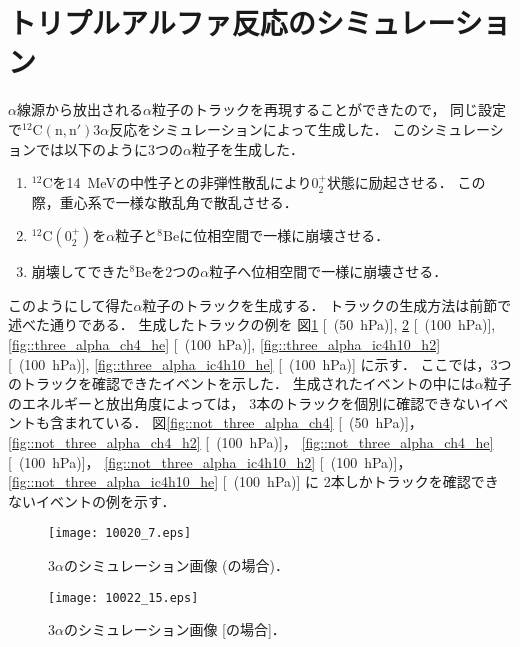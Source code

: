 \documentclass[../master]{subfiles}
\begin{document}
\section{トリプルアルファ反応のシミュレーション}
\label{sec::triple_alpha_simulation}
$\alpha$線源から放出される$\alpha$粒子のトラックを再現することができたので，
同じ設定で${}^{12}{\mathrm{C}}({\mathrm{n}},{\mathrm{n}}')3\alpha$反応をシミュレーションによって生成した．
このシミュレーションでは以下のように3つの$\alpha$粒子を生成した．
\begin{enumerate}
\item
  ${}^{12}\mathrm{C}$を\SI{14}{\mega\electronvolt}の中性子との非弾性散乱により$0_2^+$状態に励起させる．
  この際，重心系で一様な散乱角で散乱させる．
\item
  ${}^{12}\mathrm{C} (0_2^+)$を$\alpha$粒子と${}^{8}\mathrm{Be}$に位相空間で一様に崩壊させる．
\item
  崩壊してできた${}^{8}\mathrm{Be}$を2つの$\alpha$粒子へ位相空間で一様に崩壊させる．
\end{enumerate}
このようにして得た$\alpha$粒子のトラックを生成する．
トラックの生成方法は前節で述べた通りである．
生成したトラックの例を
図\ref{fig::three_alpha_ch4} [\Methane~(\SI{50}{\hecto\pascal})],
\ref{fig::three_alpha_ch4_h2} [\Methane~(\SI{100}{\hecto\pascal})],
\ref{fig::three_alpha_ch4_he} [\Methane~(\SI{100}{\hecto\pascal})],
\ref{fig::three_alpha_ic4h10_h2} [\isoButaneHydro~(\SI{100}{\hecto\pascal})],
\ref{fig::three_alpha_ic4h10_he} [\isoButaneHerium~(\SI{100}{\hecto\pascal})] に示す．
ここでは，3つのトラックを確認できたイベントを示した．
生成されたイベントの中には$\alpha$粒子のエネルギーと放出角度によっては，
3本のトラックを個別に確認できないイベントも含まれている．
図\ref{fig::not_three_alpha_ch4} [\Methane~(\SI{50}{\hecto\pascal})]，
\ref{fig::not_three_alpha_ch4_h2} [\MethaneHydro~(\SI{100}{\hecto\pascal})]，
\ref{fig::not_three_alpha_ch4_he} [\MethaneHerium~(\SI{100}{\hecto\pascal})]，
\ref{fig::not_three_alpha_ic4h10_h2} [\isoButaneHydro~(\SI{100}{\hecto\pascal})]，
\ref{fig::not_three_alpha_ic4h10_he} [\isoButaneHerium~(\SI{100}{\hecto\pascal})] に
2本しかトラックを確認できないイベントの例を示す．

\begin{figure}
  \centering
  \texttt{[image: 10020\_7.eps]}
  \caption{3$\alpha$のシミュレーション画像 (\Methane の場合)．}
  \label{fig::three_alpha_ch4}
\end{figure}

\begin{figure}
  \centering
  \texttt{[image: 10022\_15.eps]}
  \caption{3$\alpha$のシミュレーション画像 [\MethaneHydro の場合]．}
  \label{fig::three_alpha_ch4_h2}
\end{figure}
\end{document}
